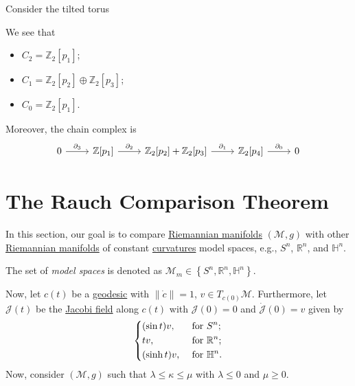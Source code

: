 \begin{eg}
	Consider the tilted torus
	\begin{center}
	\end{center}
	We see that
	\begin{itemize}
		\item \(C_2 = \mathbb{Z} _2 [p_1]\);
		\item \(C_1 = \mathbb{Z} _2[p_2] \oplus \mathbb{Z} _2[p_3]\);
		\item \(C_0 = \mathbb{Z} _2[p_1]\).
	\end{itemize}
	Moreover, the chain complex is
	\[\begin{tikzcd}
			0 & {\mathbb{Z}[p_1]} & {\mathbb{Z}_2[p_2]+\mathbb{Z}_2[p_3]} & {\mathbb{Z}_2[p_4]} & 0
			\arrow["{\partial_3}", from=1-1, to=1-2]
			\arrow["{\partial_2}", from=1-2, to=1-3]
			\arrow["{\partial_1}", from=1-3, to=1-4]
			\arrow["{\partial_0}", from=1-4, to=1-5]
		\end{tikzcd}\]
\end{eg}

\section{The Rauch Comparison Theorem}
In this section, our goal is to compare \hyperref[def:Riemannian-manifold]{Riemannian manifolds} \((\mathcal{M} , g)\) with other \hyperref[def:Riemannian-manifold]{Riemannian manifolds} of constant \hyperref[def:sectional-curvature]{curvatures} model spaces, e.g., \(S^n\), \(\mathbb{R} ^n\), and \(\mathbb{H} ^n\).

\begin{notation}
	The set of \emph{model spaces} is denoted as \(\mathcal{M} _m \in \left\{ S^n, \mathbb{R} ^n, \mathbb{H} ^n \right\} \).
\end{notation}

Now, let \(c(t)\) be a \hyperref[def:geodesic]{geodesic} with \(\lVert \dot{c} \rVert =1\), \(v\in T_{c(0)} \mathcal{M} \). Furthermore, let \(\mathcal{J} (t)\) be the \hyperref[def:Jacobi-field]{Jacobi field} along \(c(t)\) with \(\mathcal{J} (0) = 0\) and \(\dot{\mathcal{J} }(0) = v \) given by
\[
	\begin{dcases}
		(\sin t)v,  & \text{ for } S^n ;           \\
		tv,         & \text{ for } \mathbb{R} ^n ; \\
		(\sinh t)v, & \text{ for } \mathbb{H} ^n .
	\end{dcases}
\]
Now, consider \((\mathcal{M} , g)\) such that \(\lambda \leq \kappa \leq \mu \) with \(\lambda \leq 0\) and \(\mu \geq 0\).

